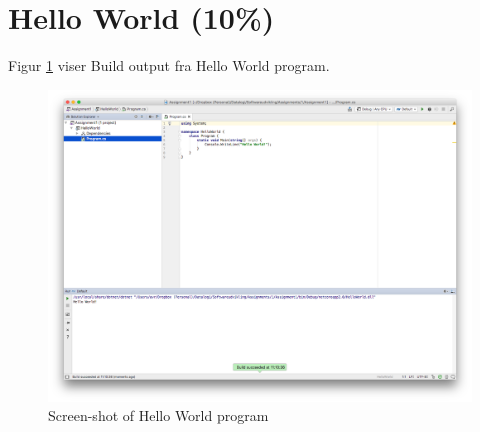 \section{Hello World (10\%)}
Figur \ref{fig:rider1} viser Build output fra Hello World program.
\begin{figure}[ht]
  \centering
  \includegraphics[width=1\linewidth]{rider1}
  \caption{Screen-shot of Hello World program}
  \label{fig:rider1}
\end{figure}
